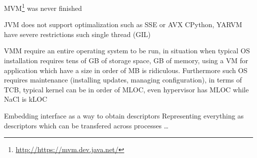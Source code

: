 MVM\footnote{\url{http://https://mvm.dev.java.net/}} was never finished

JVM does not support optimalization such as SSE or AVX
CPython, YARVM have severe restrictions such single thread (GIL)

VMM require an entire operating system to be run, in situation when
typical OS installation requires tens of GB of storage space, GB of
memory, using a VM for application which have a size in order of MB is
ridiculous. Furthermore such OS requires maintenance (installing updates,
managing configuration), in terms of TCB, typical kernel can be in
order of MLOC, even hypervisor has MLOC while NaCl is kLOC



Embedding interface as a way to obtain descriptors
Representing everything as descriptors which can be transfered across
processes \ldots
